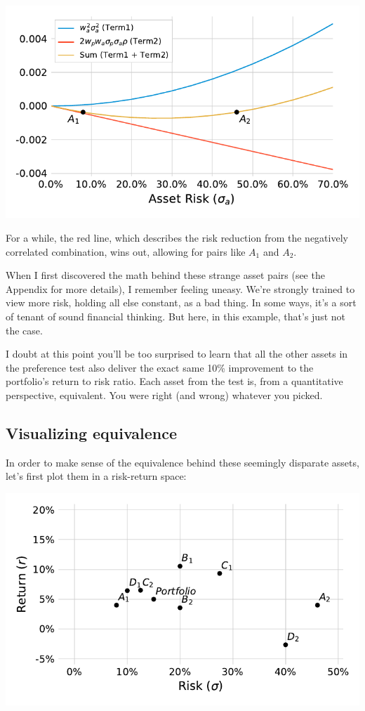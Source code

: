 \documentclass[]{article}
\begin{document}
\begin{center}\includegraphics{paper_files/figure-latex/Risk terms-1} \end{center}

For a while, the red line, which describes the risk reduction from the
negatively correlated combination, wins out, allowing for pairs like
\(A_1\) and \(A_2\).

When I first discovered the math behind these strange asset pairs (see
the Appendix for more details), I remember feeling uneasy. We're
strongly trained to view more risk, holding all else constant, as a bad
thing. In some ways, it's a sort of tenant of sound financial thinking.
But here, in this example, that's just not the case.

I doubt at this point you'll be too surprised to learn that all the
other assets in the preference test also deliver the exact same 10\%
improvement to the portfolio's return to risk ratio. Each asset from the
test is, from a quantitative perspective, equivalent. You were right
(and wrong) whatever you picked.

\hypertarget{visualizing-equivalence}{%
\subsection{Visualizing equivalence}\label{visualizing-equivalence}}

In order to make sense of the equivalence behind these seemingly
disparate assets, let's first plot them in a risk-return space:

\begin{center}\includegraphics{paper_files/figure-latex/Scatter-1} \end{center}
\end{document}
